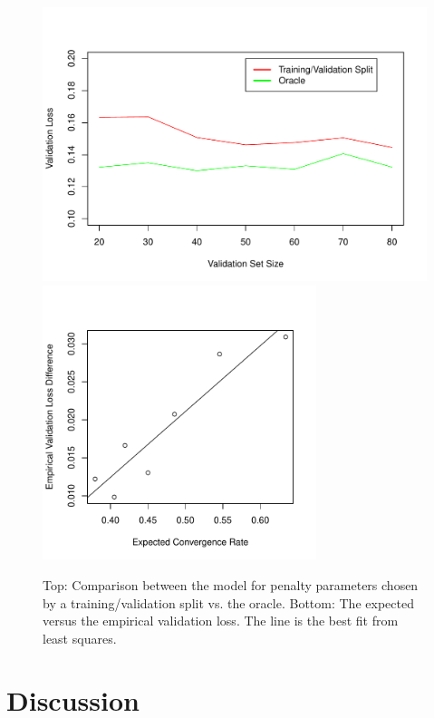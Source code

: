 \documentclass[12pt]{article}
\begin{document}
\begin{figure}
\label{fig:emp_v_theory}
\caption{Top: Comparison between the model for penalty parameters chosen by a training/validation split vs. the oracle. Bottom: The expected versus the empirical validation loss. The line is the best fit from least squares.}
\centering
\includegraphics[height=80mm]{../R/figures/validation_size_loss.pdf}
\includegraphics[height=80mm]{../R/figures/qqplot.pdf}
\end{figure}

\section{Discussion}\label{sec:discussion}

\end{document}
